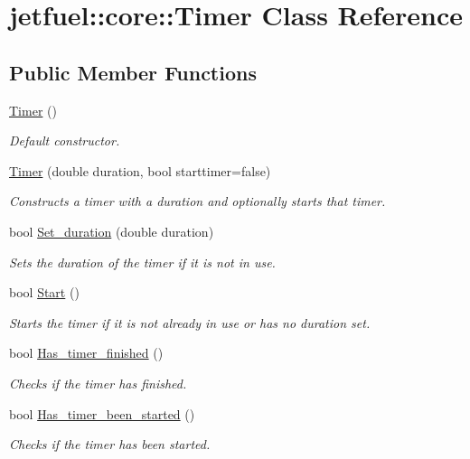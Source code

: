 \hypertarget{classjetfuel_1_1core_1_1Timer}{}\section{jetfuel\+:\+:core\+:\+:Timer Class Reference}
\label{classjetfuel_1_1core_1_1Timer}
\subsection*{Public Member Functions}
\begin{DoxyCompactItemize}
\item 
\hyperlink{classjetfuel_1_1core_1_1Timer_ac27fee7c9a0acbdbe7650b087ec26a7b}{Timer} ()
\begin{DoxyCompactList}\small\item\em Default constructor. \end{DoxyCompactList}\item 
\hyperlink{classjetfuel_1_1core_1_1Timer_ad856b1bc0f24893dafd8c608831adcf9}{Timer} (double duration, bool starttimer=false)
\begin{DoxyCompactList}\small\item\em Constructs a timer with a duration and optionally starts that timer. \end{DoxyCompactList}\item 
bool \hyperlink{classjetfuel_1_1core_1_1Timer_ae2ab6506258494eb67eed42b04931cde}{Set\+\_\+duration} (double duration)
\begin{DoxyCompactList}\small\item\em Sets the duration of the timer if it is not in use. \end{DoxyCompactList}\item 
bool \hyperlink{classjetfuel_1_1core_1_1Timer_a4f41614b70ab87a40ecd5ce55f2fc224}{Start} ()
\begin{DoxyCompactList}\small\item\em Starts the timer if it is not already in use or has no duration set. \end{DoxyCompactList}\item 
bool \hyperlink{classjetfuel_1_1core_1_1Timer_a8d6efef6a9e6aae8156fd1f8dce5f403}{Has\+\_\+timer\+\_\+finished} ()
\begin{DoxyCompactList}\small\item\em Checks if the timer has finished. \end{DoxyCompactList}\item 
bool \hyperlink{classjetfuel_1_1core_1_1Timer_a6442806833e30cc94d6c17dd91243c57}{Has\+\_\+timer\+\_\+been\+\_\+started} ()
\begin{DoxyCompactList}\small\item\em Checks if the timer has been started. \end{DoxyCompactList}\end{DoxyCompactItemize}


